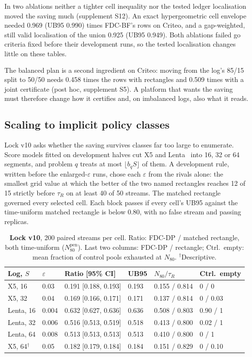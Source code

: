 \documentclass[sigconf,anonymous,review]{acmart}
\newcommand{\eps}{\varepsilon}
\newcommand{\Npen}{N_{80}^{\text{pen}}}
\begin{document}
In two ablations neither a tighter cell inequality nor the tested ledger localisation moved the saving much (supplement S12). An exact hypergeometric cell envelope needed 0.969 (UB95 0.990) times FDC-BF's rows on Criteo, and a gap-weighted, still valid localisation of the union 0.925 (UB95 0.949). Both ablations failed go criteria fixed before their development runs, so the tested localisation changes little on these tables.

The balanced plan is a second ingredient on Criteo: moving from the log's 85/15 split to 50/50 needs 0.458 times the rows with rectangles and 0.509 times with a joint certificate (post hoc, supplement S5). A platform that wants the saving must therefore change how it certifies and, on imbalanced logs, also what it reads.

\subsection{Scaling to implicit policy classes}\label{sec:scale}

Lock v10 asks whether the saving survives classes far too large to enumerate. Score models fitted on development halves cut X5 and Lenta~\citep{scikituplift2020} into 16, 32 or 64 segments, and problem $q$ treats at most $\lfloor b_q S \rfloor$ of them. A development rule, written before the enlarged-$\eps$ runs, chose each $\eps$ from the rivals alone: the smallest grid value at which the better of the two named rectangles reaches 12 of 15 strictly before $\tau_R$ on at least 40 of 50 streams. The matched rectangle governed every selected cell. Each block passes if every cell's UB95 against the time-uniform matched rectangle is below 0.80, with no false stream and passing replicas.

\begin{table}[t]
\caption{\textbf{Lock v10}, 200 paired streams per cell. Ratio: FDC-DP / matched rectangle, both time-uniform ($\Npen$). Last two columns: FDC-DP / rectangle; Ctrl.\ empty: mean fraction of control pools exhausted at $N_{80}$. $^\dagger$Descriptive.}
\label{tab:scale}
\small
\setlength{\tabcolsep}{2.6pt}
\begin{tabular}{@{}llllll@{}}
\toprule
Log, $S$ & $\eps$ & Ratio [95\% CI] & UB95 & $N_{80}/\tau_R$ & Ctrl.\ empty \\
\midrule
X5, 16 & 0.03 & 0.191 [0.188, 0.193] & 0.193 & 0.155 / 0.814 & 0 / 0 \\
X5, 32 & 0.04 & 0.169 [0.166, 0.171] & 0.171 & 0.137 / 0.814 & 0 / 0.03 \\
Lenta, 16 & 0.004 & 0.632 [0.627, 0.636] & 0.636 & 0.508 / 0.803 & 0.90 / 1 \\
Lenta, 32 & 0.006 & 0.516 [0.513, 0.519] & 0.518 & 0.413 / 0.800 & 0.02 / 1 \\
Lenta, 64 & 0.008 & 0.513 [0.513, 0.513] & 0.513 & 0.410 / 0.800 & 0 / 1 \\
X5, 64$^\dagger$ & 0.05 & 0.182 [0.179, 0.184] & 0.184 & 0.151 / 0.829 & 0 / 0.10 \\
\bottomrule
\end{tabular}
\end{table}
\end{document}
